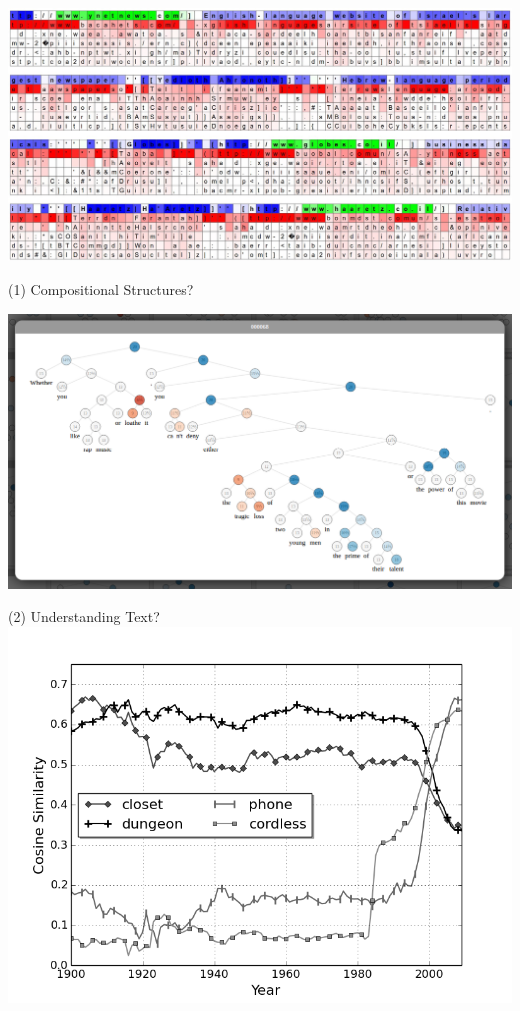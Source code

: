 \documentclass{beamer}
\begin{document}
\begin{frame}
  \begin{center}
    \includegraphics[width=\textwidth]{lstm1}
  \end{center}
\end{frame}

\begin{frame}{(1) Compositional Structures?}
  \begin{center}
    \includegraphics[width=\textwidth]{sentiment}
  \end{center}
\end{frame}

\begin{frame}{(2) Understanding Text?}
  \includegraphics[width=\textwidth]{cell}
\end{frame}
\end{document}
